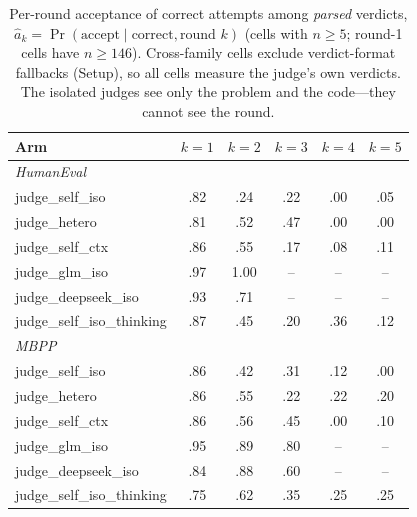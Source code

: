 \documentclass[10pt]{article}
\begin{document}
\begin{table}[t]
\centering\small
\caption{Per-round acceptance of correct attempts among
\emph{parsed} verdicts, $\hat a_k =
\Pr(\text{accept} \mid \text{correct}, \text{round } k)$ (cells
with $n \ge 5$; round-1 cells have $n \ge 146$).  Cross-family
cells exclude verdict-format fallbacks (Setup), so all cells
measure the judge's own verdicts.  The isolated judges see only
the problem and the code---they cannot see the round.}
\label{tab:ak}
\begin{tabular}{lccccc}
\toprule
Arm & $k{=}1$ & $k{=}2$ & $k{=}3$ & $k{=}4$ & $k{=}5$\\
\midrule
\multicolumn{6}{l}{\emph{HumanEval}}\\
judge\_self\_iso & .82 & .24 & .22 & .00 & .05\\
judge\_hetero & .81 & .52 & .47 & .00 & .00\\
judge\_self\_ctx & .86 & .55 & .17 & .08 & .11\\
judge\_glm\_iso & .97 & 1.00 & -- & -- & --\\
judge\_deepseek\_iso & .93 & .71 & -- & -- & --\\
judge\_self\_iso\_thinking & .87 & .45 & .20 & .36 & .12\\
\midrule
\multicolumn{6}{l}{\emph{MBPP}}\\
judge\_self\_iso & .86 & .42 & .31 & .12 & .00\\
judge\_hetero & .86 & .55 & .22 & .22 & .20\\
judge\_self\_ctx & .86 & .56 & .45 & .00 & .10\\
judge\_glm\_iso & .95 & .89 & .80 & -- & --\\
judge\_deepseek\_iso & .84 & .88 & .60 & -- & --\\
judge\_self\_iso\_thinking & .75 & .62 & .35 & .25 & .25\\
\bottomrule
\end{tabular}
\end{table}
\end{document}
